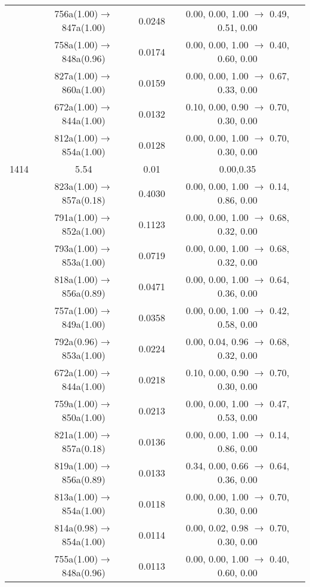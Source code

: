 \documentclass[10pt,a4paper]{article}
\begin{document}
\begin{longtable}{c|c|c|c}
 	& 756a(1.00)$\rightarrow$847a(1.00) &	 0.0248 &	 0.00, 0.00, 1.00 $\rightarrow$ 0.49, 0.51, 0.00 \\ 
 	& 758a(1.00)$\rightarrow$848a(0.96) &	 0.0174 &	 0.00, 0.00, 1.00 $\rightarrow$ 0.40, 0.60, 0.00 \\ 
 	& 827a(1.00)$\rightarrow$860a(1.00) &	 0.0159 &	 0.00, 0.00, 1.00 $\rightarrow$ 0.67, 0.33, 0.00 \\ 
 	& 672a(1.00)$\rightarrow$844a(1.00) &	 0.0132 &	 0.10, 0.00, 0.90 $\rightarrow$ 0.70, 0.30, 0.00 \\ 
 	& 812a(1.00)$\rightarrow$854a(1.00) &	 0.0128 &	 0.00, 0.00, 1.00 $\rightarrow$ 0.70, 0.30, 0.00 \\ 
 \hline1414 &	 5.54 &	 0.01 &	 0.00,0.35 \\ 
  	& 823a(1.00)$\rightarrow$857a(0.18) &	 0.4030 &	 0.00, 0.00, 1.00 $\rightarrow$ 0.14, 0.86, 0.00 \\ 
 	& 791a(1.00)$\rightarrow$852a(1.00) &	 0.1123 &	 0.00, 0.00, 1.00 $\rightarrow$ 0.68, 0.32, 0.00 \\ 
 	& 793a(1.00)$\rightarrow$853a(1.00) &	 0.0719 &	 0.00, 0.00, 1.00 $\rightarrow$ 0.68, 0.32, 0.00 \\ 
 	& 818a(1.00)$\rightarrow$856a(0.89) &	 0.0471 &	 0.00, 0.00, 1.00 $\rightarrow$ 0.64, 0.36, 0.00 \\ 
 	& 757a(1.00)$\rightarrow$849a(1.00) &	 0.0358 &	 0.00, 0.00, 1.00 $\rightarrow$ 0.42, 0.58, 0.00 \\ 
 	& 792a(0.96)$\rightarrow$853a(1.00) &	 0.0224 &	 0.00, 0.04, 0.96 $\rightarrow$ 0.68, 0.32, 0.00 \\ 
 	& 672a(1.00)$\rightarrow$844a(1.00) &	 0.0218 &	 0.10, 0.00, 0.90 $\rightarrow$ 0.70, 0.30, 0.00 \\ 
 	& 759a(1.00)$\rightarrow$850a(1.00) &	 0.0213 &	 0.00, 0.00, 1.00 $\rightarrow$ 0.47, 0.53, 0.00 \\ 
 	& 821a(1.00)$\rightarrow$857a(0.18) &	 0.0136 &	 0.00, 0.00, 1.00 $\rightarrow$ 0.14, 0.86, 0.00 \\ 
 	& 819a(1.00)$\rightarrow$856a(0.89) &	 0.0133 &	 0.34, 0.00, 0.66 $\rightarrow$ 0.64, 0.36, 0.00 \\ 
 	& 813a(1.00)$\rightarrow$854a(1.00) &	 0.0118 &	 0.00, 0.00, 1.00 $\rightarrow$ 0.70, 0.30, 0.00 \\ 
 	& 814a(0.98)$\rightarrow$854a(1.00) &	 0.0114 &	 0.00, 0.02, 0.98 $\rightarrow$ 0.70, 0.30, 0.00 \\ 
 	& 755a(1.00)$\rightarrow$848a(0.96) &	 0.0113 &	 0.00, 0.00, 1.00 $\rightarrow$ 0.40, 0.60, 0.00 \\ 

\end{longtable}
\end{document}
